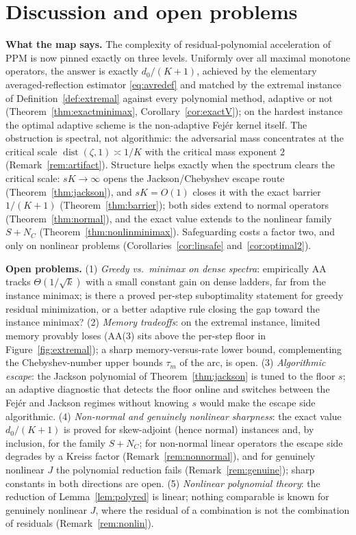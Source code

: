 \documentclass[11pt]{article}
\theoremstyle{definition}
\theoremstyle{remark}
\DeclareMathOperator{\dist}{dist}
\begin{document}
\section{Discussion and open problems}\label{sec:discussion}

\textbf{What the map says.} The complexity of residual-polynomial
acceleration of PPM is now pinned exactly on three levels. Uniformly over
all maximal monotone operators, the answer is exactly $d_0/(K+1)$,
achieved by the elementary averaged-reflection estimator
\eqref{eq:avredef} and matched by the extremal instance of
Definition~\ref{def:extremal} against every polynomial method, adaptive or
not (Theorem~\ref{thm:exactminimax}, Corollary~\ref{cor:exactV}); on the
hardest instance the optimal adaptive scheme is the non-adaptive Fej\'er
kernel itself. The obstruction is spectral, not algorithmic: the
adversarial mass concentrates at the critical scale
$\dist(\zeta,1)\asymp1/K$ with the critical mass exponent $2$
(Remark~\ref{rem:artifact}). Structure helps exactly when the spectrum
clears the critical scale: $sK\to\infty$ opens the Jackson/Chebyshev
escape route (Theorem~\ref{thm:jackson}), and $sK=O(1)$ closes it with the
exact barrier $1/(K+1)$ (Theorem~\ref{thm:barrier}); both sides extend to
normal operators (Theorem~\ref{thm:normal}), and the exact value extends
to the nonlinear family $S+N_C$ (Theorem~\ref{thm:nonlinminimax}).
Safeguarding costs a factor two, and only on nonlinear problems
(Corollaries~\ref{cor:linsafe} and~\ref{cor:optimal2}).

\textbf{Open problems.}
(1) \emph{Greedy vs.\ minimax on dense spectra}: empirically AA tracks
$\Theta(1/\sqrt{k})$ with a small constant gain on dense ladders, far from
the instance minimax; is there a proved per-step suboptimality statement
for greedy residual minimization, or a better adaptive rule closing the
gap toward the instance minimax?
(2) \emph{Memory tradeoffs}: on the extremal instance, limited memory
provably loses (AA(3) sits above the per-step floor in
Figure~\ref{fig:extremal}); a sharp memory-versus-rate lower bound,
complementing the Chebyshev-number upper bounds $\tau_m$ of the arc, is
open.
(3) \emph{Algorithmic escape}: the Jackson polynomial of
Theorem~\ref{thm:jackson} is tuned to the floor $s$; an adaptive
diagnostic that detects the floor online and switches between the Fej\'er
and Jackson regimes without knowing $s$ would make the escape side
algorithmic.
(4) \emph{Non-normal and genuinely nonlinear sharpness}: the exact value
$d_0/(K+1)$ is proved for skew-adjoint (hence normal) instances and, by
inclusion, for the family $S+N_C$; for non-normal linear operators the
escape side degrades by a Kreiss factor (Remark~\ref{rem:nonnormal}), and
for genuinely nonlinear $J$ the polynomial reduction fails
(Remark~\ref{rem:genuine}); sharp constants in both directions are open.
(5) \emph{Nonlinear polynomial theory}: the reduction of
Lemma~\ref{lem:polyred} is linear; nothing comparable is known for
genuinely nonlinear $J$, where the residual of a combination is not the
combination of residuals (Remark~\ref{rem:nonlin}).
\end{document}
